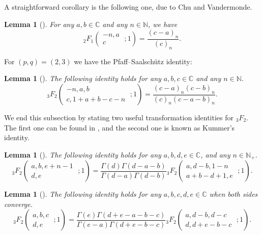 \documentclass[12pt, pdflatex, a4paper]{article}
\theoremstyle{plain}
\newtheorem{lemma}[thm]{Lemma}
\theoremstyle{definition}
\def\C{{\mathbb C}}
\def\N{{\mathbb N}}
\begin{document}
A straightforward corollary is the following one, due to Chu and Vandermonde.

\begin{lemma}[{\normalfont\cite[Cor. 2.2.3]{AAR99}}] For any $a, b \in \C$ and any $n \in \N$, we have
\begin{equation}\label{Chu-Vandermonde}
{}_2F_1\left(\begin{matrix}
-n, a\\
c
\end{matrix}\; ; 1 \right) = \frac{(c-a)_n}{(c)_n}.
\end{equation}
\end{lemma}
For $(p, q) = (2, 3)$ we have the Pfaff--Saalschütz identity:
\begin{lemma}[{\normalfont\cite[Thm. 2.2.6]{AAR99}}] The following identity holds for any $a, b, c \in \C$ and any $n \in \N$.
\begin{equation}\label{pfaff-saalschutz}
{}_3F_2\left(
\begin{matrix}
-n, a, b\\
c, 1+a+b-c-n
\end{matrix}\; ; 1\right) = \frac{(c-a)_n(c-b)_n}{(c)_n(c-a-b)_n}.
\end{equation}
\end{lemma}

We end this subsection by stating two useful transformation identities for ${}_3F_2$. The first one can be found in \cite{AAR99}, and the second one is known as Kummer's identity.

\begin{lemma}[{\normalfont\cite[Eq. (2.4.12)]{AAR99}}] The following identity holds for any $a, b, d, e \in \C$, and any $n \in \N_+$.
\begin{equation}\label{aar-identity}
{}_3F_2\left(
\begin{matrix}
a, b, e+n-1\\
d, e
\end{matrix}\; ; 1\right) = \frac{\Gamma(d)\Gamma(d-a-b)}{\Gamma(d-a)\Gamma(d-b)}{}_3F_2\left(
\begin{matrix}
a, d-b, 1-n\\
a+b-d+1, e
\end{matrix}\; ; 1\right).
\end{equation}
\end{lemma}

\begin{lemma}[{\normalfont\cite[Cor. 3.3.5]{AAR99}}] The following identity holds for any $a, b, c, d, e \in \C$ when both sides converge.
\begin{equation}\label{kummer}
{}_3F_2\left(
\begin{matrix}
a, b, c\\
d, e
\end{matrix}\; ; 1\right) = \frac{\Gamma(e)\Gamma(d+e-a-b-c)}{\Gamma(e-a)\Gamma(d+e-b-c)}{}_3F_2\left(
\begin{matrix}
a, d-b, d-c\\
d, d+e-b-c
\end{matrix}\; ; 1\right).
\end{equation}
\end{lemma}
\end{document}
